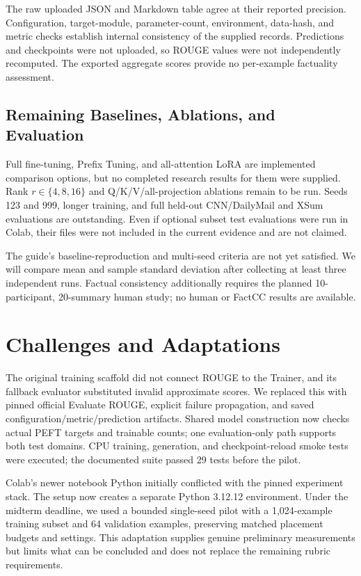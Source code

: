 \documentclass[11pt, letterpaper]{article}
\begin{document}
The raw uploaded JSON and Markdown table agree at their reported precision.
Configuration, target-module, parameter-count, environment, data-hash, and metric
checks establish internal consistency of the supplied records. Predictions and
checkpoints were not uploaded, so ROUGE values were not independently recomputed.
The exported aggregate scores provide no per-example factuality assessment.

\subsection{Remaining Baselines, Ablations, and Evaluation}
Full fine-tuning, Prefix Tuning, and all-attention LoRA are implemented comparison
options, but no completed research results for them were supplied. Rank
$r\in\{4,8,16\}$ and Q/K/V/all-projection ablations remain to be run.
Seeds 123 and 999, longer training, and full held-out CNN/DailyMail and XSum
evaluations are outstanding. Even if optional subset test evaluations were run
in Colab, their files were not included in the current evidence and are not claimed.

The guide's baseline-reproduction and multi-seed criteria are not yet satisfied.
We will compare mean and sample standard deviation after collecting at least
three independent runs. Factual consistency additionally requires the planned
10-participant, 20-summary human study; no human or FactCC results are available.


\section{Challenges and Adaptations}
The original training scaffold did not connect ROUGE to the Trainer, and its
fallback evaluator substituted invalid approximate scores. We replaced this
with pinned official Evaluate ROUGE, explicit failure propagation, and saved
configuration/metric/prediction artifacts. Shared model construction now checks
actual PEFT targets and trainable counts; one evaluation-only path supports both
test domains. CPU training, generation, and checkpoint-reload smoke tests were
executed; the documented suite passed 29 tests before the pilot.

Colab's newer notebook Python initially conflicted with the pinned experiment
stack. The setup now creates a separate Python 3.12.12 environment. Under the
midterm deadline, we used a bounded single-seed pilot with a 1,024-example training
subset and 64 validation examples, preserving matched placement budgets and
settings. This adaptation supplies genuine preliminary measurements but limits
what can be concluded and does not replace the remaining rubric requirements.
\end{document}
